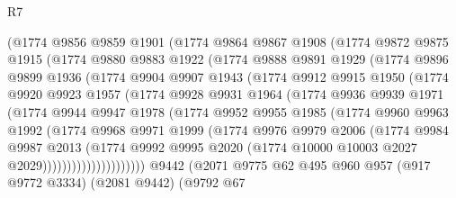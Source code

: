 \begin{lexlean}{R7}
\begin{coremodule}
        (@1774
          @9856
          @9859
          @1901
          (@1774
            @9864
            @9867
            @1908
            (@1774
              @9872
              @9875
              @1915
              (@1774
                @9880
                @9883
                @1922
                (@1774
                  @9888
                  @9891
                  @1929
                  (@1774
                    @9896
                    @9899
                    @1936
                    (@1774
                      @9904
                      @9907
                      @1943
                      (@1774
                        @9912
                        @9915
                        @1950
                        (@1774
                          @9920
                          @9923
                          @1957
                          (@1774
                            @9928
                            @9931
                            @1964
                            (@1774
                              @9936
                              @9939
                              @1971
                              (@1774
                                @9944
                                @9947
                                @1978
                                (@1774
                                  @9952
                                  @9955
                                  @1985
                                  (@1774
                                    @9960
                                    @9963
                                    @1992
                                    (@1774
                                      @9968
                                      @9971
                                      @1999
                                      (@1774
                                        @9976
                                        @9979
                                        @2006
                                        (@1774
                                          @9984
                                          @9987
                                          @2013
                                          (@1774
                                            @9992
                                            @9995
                                            @2020
                                            (@1774 @10000 @10003 @2027 @2029)))))))))))))))))))))
    @9442
    (@2071
      @9775
      @62
      @495
      @960
      @957
      (@917 @9772 @3334)
      (@2081 @9442)
      (@9792
        @67

\end{coremodule}
\end{lexlean}
